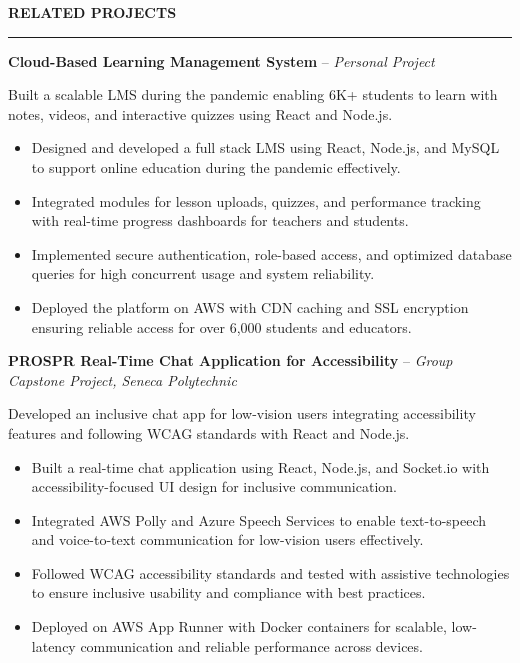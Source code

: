 \documentclass[10pt,letterpaper]{article}
\begin{document}
\vspace{6pt}

\textbf{RELATED PROJECTS}\\[-8pt]
\noindent\rule{\textwidth}{1pt}

\vspace{-2pt}

\textbf{Cloud-Based Learning Management System} -- \emph{Personal Project}

\vspace{-1pt}

Built a scalable LMS during the pandemic enabling 6K+ students to learn with notes, videos, and interactive quizzes using React and Node.js.
\vspace{-1pt}
\begin{itemize}
\item Designed and developed a full stack LMS using React, Node.js, and MySQL to support online education during the pandemic effectively.
\item Integrated modules for lesson uploads, quizzes, and performance tracking with real-time progress dashboards for teachers and students.
\item Implemented secure authentication, role-based access, and optimized database queries for high concurrent usage and system reliability.
\item Deployed the platform on AWS with CDN caching and SSL encryption ensuring reliable access for over 6,000 students and educators.
\end{itemize}

\textbf{PROSPR  Real-Time Chat Application for Accessibility} -- \emph{Group Capstone Project, Seneca Polytechnic}

\vspace{-1pt}

Developed an inclusive chat app for low-vision users integrating accessibility features and following WCAG standards with React and Node.js.
\vspace{-1pt}
\begin{itemize}
\item Built a real-time chat application using React, Node.js, and Socket.io with accessibility-focused UI design for inclusive communication.
\item Integrated AWS Polly and Azure Speech Services to enable text-to-speech and voice-to-text communication for low-vision users effectively.
\item Followed WCAG accessibility standards and tested with assistive technologies to ensure inclusive usability and compliance with best practices.
\item Deployed on AWS App Runner with Docker containers for scalable, low-latency communication and reliable performance across devices.
\end{itemize}
\end{document}
